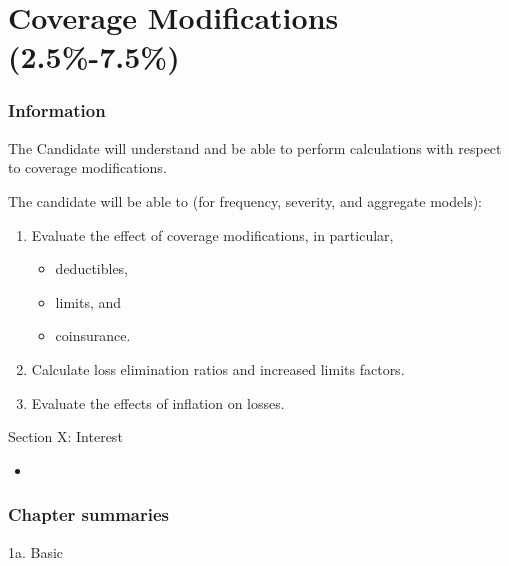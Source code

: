 \chapter[Coverage Modifications]{Coverage Modifications (2.5\%-7.5\%)}

\subsection{Information}

\begin{distributions}[Objective]
The Candidate will understand and be able to perform calculations with respect to coverage modifications.
\end{distributions}

\begin{outcomes}
The candidate will be able to (for frequency, severity, and aggregate models):
\begin{enumerate}[label = \alph*), leftmargin = *]
	\item	Evaluate the effect of coverage modifications, in particular, 
		\begin{itemize}[leftmargin = *]
		\item	deductibles, 
		\item	limits, and 
		\item	coinsurance.
		\end{itemize}
	\item	Calculate loss elimination ratios and increased limits factors.
	\item	Evaluate the effects of inflation on losses.
\end{enumerate}
\end{outcomes}

\begin{ASM_chapter}
Section X: Interest 
\begin{itemize}[leftmargin = *]
	\item	{}
\end{itemize}
\end{ASM_chapter}

\subsection{Chapter summaries}

\begin{CHPT_SUMM_AUTO}[label = {L.-1a}]{1a. Basic}

\end{CHPT_SUMM_AUTO}
